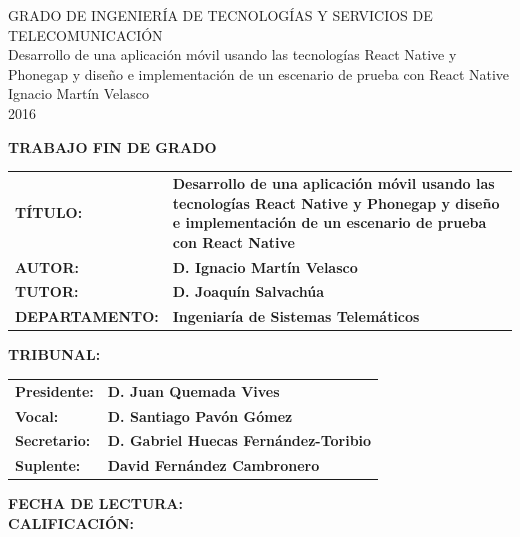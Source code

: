\documentclass[hidelinks,11pt,a4paper]{report}
\newcommand\blankpage{%
	\null
	\thispagestyle{empty}%
	\newpage}
\begin{document}
\begin{titlepage}
\centering
\vspace*{\fill}
\huge{GRADO DE INGENIERÍA DE TECNOLOGÍAS Y SERVICIOS DE TELECOMUNICACIÓN}\\
\vspace*{\fill}
\huge{Desarrollo de una aplicación móvil usando las tecnologías React Native y Phonegap y diseño e implementación de un escenario de prueba con React Native}\\
\vspace*{\fill}
\huge{Ignacio Martín Velasco}\\
\huge{2016}\\
\vspace*{\fill}
\afterpage{\blankpage}
\end{titlepage}
\vspace*{10mm}
\textbf{\large{TRABAJO FIN DE GRADO}\\}
\begin{table}[H]
	\label{my-label}
	\begin{tabular}{lp{10cm}}
		\textbf{TÍTULO:}       & \textbf{Desarrollo de una aplicación móvil usando las tecnologías React Native y Phonegap y diseño e implementación de un escenario de prueba con React Native} \\[2mm]
		\textbf{AUTOR:}        & \textbf{D. Ignacio Martín Velasco}\\[2mm]
		\textbf{TUTOR:}        & \textbf{D. Joaquín Salvachúa}\\[2mm]
		\textbf{DEPARTAMENTO:} & \textbf{Ingeniaría de Sistemas Telemáticos}                                                                                                                     
	\end{tabular}
\end{table}
\vspace*{\fill}
\textbf{\large{TRIBUNAL:  }\\}
\begin{table}[H]
	\label{my-label2}
	\begin{tabular}{lp{12cm}}
		\textbf{Presidente:}       & \textbf{D. Juan Quemada Vives} \\[2mm]
		\textbf{Vocal:} & \textbf{D. Santiago Pavón Gómez}\\[2mm]
		\textbf{Secretario:} & \textbf{D. Gabriel Huecas Fernández-Toribio}\\[2mm]
		\textbf{Suplente:} & \textbf{David Fernández Cambronero}
	\end{tabular}
\end{table}
\vspace*{\fill}
\textbf{\large{FECHA DE LECTURA:\,\,\,\hrulefill}\\[15mm]}
\textbf{\large{CALIFICACIÓN:\,\,\,\hrulefill}\\}
\vspace*{\fill}
\afterpage{\blankpage}
\end{document}
